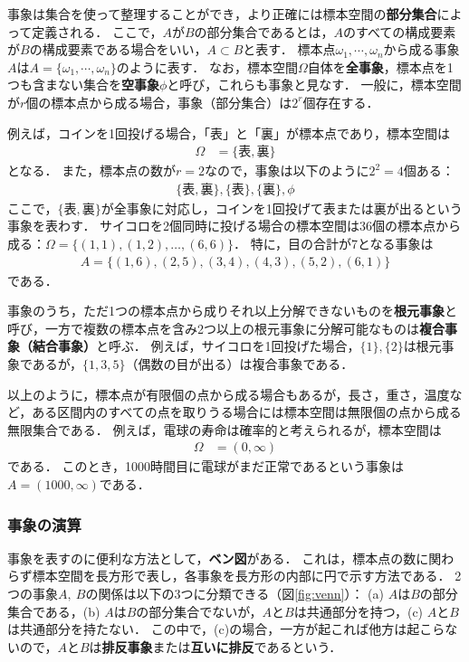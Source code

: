 %
事象は集合を使って整理することができ，より正確には標本空間の\textbf{部分集合}によって定義される．
%
ここで，$ A $が$ B $の部分集合であるとは，$ A $のすべての構成要素が$ B $の構成要素である場合をいい，$ A \subset B $と表す．
%
標本点$ \omega_{1}, \cdots, \omega_{n} $から成る事象$ A $は$ A = \{\omega_{1}, \cdots, \omega_{n}\} $のように表す．
%
なお，標本空間$ \Omega $自体を\textbf{全事象}，標本点を1つも含まない集合を\textbf{空事象}$ \phi $と呼び，これらも事象と見なす．
%
一般に，標本空間が$ r $個の標本点から成る場合，事象（部分集合）は$ 2^{r} $個存在する．
%

%
例えば，コインを1回投げる場合，「表」と「裏」が標本点であり，標本空間は
%
\begin{align*}
	\Omega &= \{表, 裏\}
\end{align*}
%
となる．
%
また，標本点の数が$ r=2 $なので，事象は以下のように$ 2^{2}=4 $個ある：
%
\begin{align*}
	\{表, 裏\}, \{表\}, \{裏\}, \phi
\end{align*}
%
ここで，$ \{表, 裏\} $が全事象に対応し，コインを1回投げて表または裏が出るという事象を表わす．
%
サイコロを2個同時に投げる場合の標本空間は36個の標本点から成る：$ \Omega=\{(1,1), (1,2),\ldots, (6,6)\} $．
%
特に，目の合計が7となる事象は
%
\begin{align*}
	A = \{(1,6), (2,5), (3,4), (4,3), (5,2), (6,1)\}
\end{align*}
%
である．
%

%
事象のうち，ただ1つの標本点から成りそれ以上分解できないものを\textbf{根元事象}と呼び，一方で複数の標本点を含み2つ以上の根元事象に分解可能なものは\textbf{複合事象（結合事象）}と呼ぶ．
%
例えば，サイコロを1回投げた場合，$ \{1\}, \{2\} $は根元事象であるが，$ \{1, 3, 5\} $（偶数の目が出る）は複合事象である．
%

%
以上のように，標本点が有限個の点から成る場合もあるが，長さ，重さ，温度など，ある区間内のすべての点を取りうる場合には標本空間は無限個の点から成る無限集合である．
%
例えば，電球の寿命は確率的と考えられるが，標本空間は
%
\begin{align*}
	\Omega &= (0, \infty)
\end{align*}
%
である．
%
このとき，1000時間目に電球がまだ正常であるという事象は$ A = (1000, \infty) $である．
%

\subsubsection*{事象の演算}
%
事象を表すのに便利な方法として，\textbf{ベン図}がある．
%
これは，標本点の数に関わらず標本空間を長方形で表し，各事象を長方形の内部に円で示す方法である．
%
2つの事象$ A,\ B $の関係は以下の3つに分類できる（図\ref{fig:venn}）：
%
(a) $ A $は$ B $の部分集合である，(b) $ A $は$ B $の部分集合でないが，$ A $と$ B $は共通部分を持つ，(c) $ A $と$ B $は共通部分を持たない．
%
この中で，(c)の場合，一方が起これば他方は起こらないので，$ A $と$ B $は\textbf{排反事象}または\textbf{互いに排反}であるという．
%

